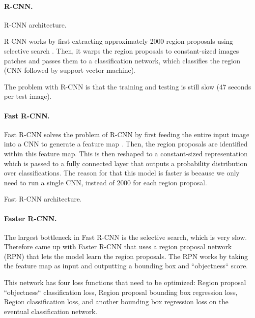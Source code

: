 \paragraph{R-CNN.}

\begin{marginfigure}[6cm]
    \centering
    \caption{R-CNN architecture.}
    \label{fig:r-cnn}
\end{marginfigure}

R-CNN works by first extracting approximately 2000 region proposals using
selective search \citep{girshick2014rich}. Then, it warps the region proposals
to constant-sized images patches and passes them to a classification network,
which classifies the region (CNN followed by support vector machine).

The problem with R-CNN is that the training and testing is still slow (47
seconds per test image).

\paragraph{Fast R-CNN.}

Fast R-CNN solves the problem of R-CNN by first feeding the entire input image
into a CNN to generate a feature map \citep{girshick2015fast}. Then, the region
proposals are identified within this feature map. This is then reshaped to a
constant-sized representation which is passed to a fully connected layer that
outputs a probability distribution over classifications. The reason for that
this model is faster is because we only need to run a single CNN, instead of
2000 for each region proposal.

\begin{marginfigure}[3cm]
    \centering
    \caption{Fast R-CNN architecture.}
    \label{fig:fast-r-cnn}
\end{marginfigure}

\paragraph{Faster R-CNN.}

The largest bottleneck in Fast R-CNN is the selective search, which is very
slow. Therefore \citet{ren2015faster} came up with Faster R-CNN that uses a
region proposal network (RPN) that lets the model learn the region proposals.
The RPN works by taking the feature map as input and outputting a bounding box
and ``objectness`` score.

This network has four loss functions that need to be optimized: Region proposal
``objectness`` classification loss, Region proposal bounding box regression
loss, Region classification loss, and another bounding box regression loss on
the eventual classification network.

